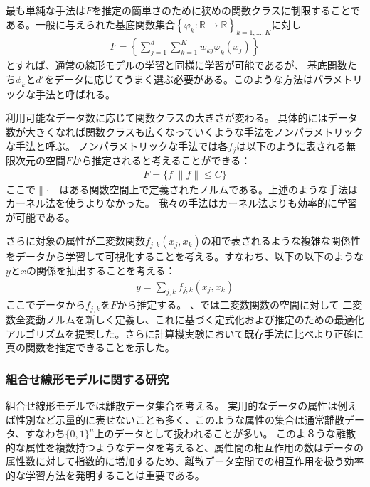 最も単純な手法は$F$を推定の簡単さのために狭めの関数クラスに制限することである。一般に与えられた基底関数集合$\left\{\varphi_k:\mathbb{R} \to \mathbb{R} \right\}_{k=1,\ldots,K}$に対し
\begin{align*}
  F=\left\{  \sum_{j=1}^d\sum_{k=1}^{K} w_{kj}\varphi_k(x_j) \right\}
\end{align*}
とすれば、通常の線形モデルの学習と同様に学習が可能であるが、
基底関数たち$\phi_k$と$d'$をデータに応じてうまく選ぶ必要がある。このような方法はパラメトリックな手法と呼ばれる。

利用可能なデータ数に応じて関数クラスの大きさが変わる。
具体的にはデータ数が大きくなれば関数クラスも広くなっていくような手法をノンパラメトリックな手法と呼ぶ。
ノンパラメトリックな手法では各$f_j$は以下のように表される無限次元の空間$F$から推定されると考えることができる：
\begin{align*}
    F = \{f | \|f\|\le C\}
\end{align*}
ここで$\|\cdot\|$はある関数空間上で定義されたノルムである。上述のような手法はカーネル法を使うよりなかった。
我々の手法はカーネル法よりも効率的に学習が可能である。

さらに対象の属性が二変数関数$f_{j,k}(x_j,x_k)$の和で表されるような複雑な関係性をデータから学習して可視化することを考える。すなわち、以下の以下のような$y$と$x$の関係を抽出することを考える：
\begin{align*}
    y = \sum_{j,k} f_{j,k} (x_j,x_k)
\end{align*}
ここでデータから$f_{j,k}$を$F$から推定する。
\cite{KM01}、\cite{KM02}では二変数関数の空間に対して
二変数全変動ノルムを新しく定義し、これに基づく定式化および推定のための最適化アルゴリズムを提案した。さらに計算機実験において既存手法に比べより正確に真の関数を推定できることを示した。


\subsubsection{組合せ線形モデルに関する研究}

組合せ線形モデルでは離散データ集合を考える。
実用的なデータの属性は例えば性別など示量的に表せないことも多く、このような属性の集合は通常離散データ、すなわち$\{0,1\}^n$上のデータとして扱われることが多い。
このよ８うな離散的な属性を複数持つようなデータを考えると、属性間の相互作用の数はデータの属性数に対して指数的に増加するため、離散データ空間での相互作用を扱う効率的な学習方法を発明することは重要である。

